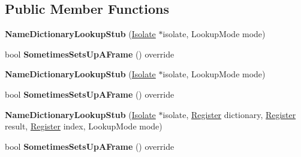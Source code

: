 \subsection*{Public Member Functions}
\begin{DoxyCompactItemize}
\item 
{\bfseries Name\+Dictionary\+Lookup\+Stub} (\hyperlink{classv8_1_1internal_1_1_isolate}{Isolate} $\ast$isolate, Lookup\+Mode mode)\hypertarget{classv8_1_1internal_1_1_name_dictionary_lookup_stub_a11b6bee94dbf9af0ea8c528a990f86bb}{}\label{classv8_1_1internal_1_1_name_dictionary_lookup_stub_a11b6bee94dbf9af0ea8c528a990f86bb}

\item 
bool {\bfseries Sometimes\+Sets\+Up\+A\+Frame} () override\hypertarget{classv8_1_1internal_1_1_name_dictionary_lookup_stub_acf6465d2597f22c42df4b301e1eaf960}{}\label{classv8_1_1internal_1_1_name_dictionary_lookup_stub_acf6465d2597f22c42df4b301e1eaf960}

\item 
{\bfseries Name\+Dictionary\+Lookup\+Stub} (\hyperlink{classv8_1_1internal_1_1_isolate}{Isolate} $\ast$isolate, Lookup\+Mode mode)\hypertarget{classv8_1_1internal_1_1_name_dictionary_lookup_stub_a11b6bee94dbf9af0ea8c528a990f86bb}{}\label{classv8_1_1internal_1_1_name_dictionary_lookup_stub_a11b6bee94dbf9af0ea8c528a990f86bb}

\item 
bool {\bfseries Sometimes\+Sets\+Up\+A\+Frame} () override\hypertarget{classv8_1_1internal_1_1_name_dictionary_lookup_stub_acf6465d2597f22c42df4b301e1eaf960}{}\label{classv8_1_1internal_1_1_name_dictionary_lookup_stub_acf6465d2597f22c42df4b301e1eaf960}

\item 
{\bfseries Name\+Dictionary\+Lookup\+Stub} (\hyperlink{classv8_1_1internal_1_1_isolate}{Isolate} $\ast$isolate, \hyperlink{structv8_1_1internal_1_1_register}{Register} dictionary, \hyperlink{structv8_1_1internal_1_1_register}{Register} result, \hyperlink{structv8_1_1internal_1_1_register}{Register} index, Lookup\+Mode mode)\hypertarget{classv8_1_1internal_1_1_name_dictionary_lookup_stub_a90cf312b88926adcb23ba808368760ed}{}\label{classv8_1_1internal_1_1_name_dictionary_lookup_stub_a90cf312b88926adcb23ba808368760ed}

\item 
bool {\bfseries Sometimes\+Sets\+Up\+A\+Frame} () override\hypertarget{classv8_1_1internal_1_1_name_dictionary_lookup_stub_acf6465d2597f22c42df4b301e1eaf960}{}\label{classv8_1_1internal_1_1_name_dictionary_lookup_stub_acf6465d2597f22c42df4b301e1eaf960}


\end{DoxyCompactItemize}
